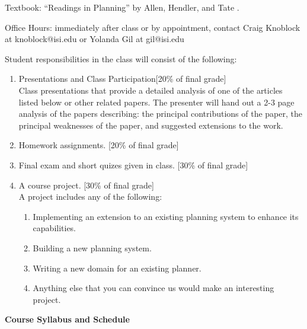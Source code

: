 {\flushleft Textbook: ``Readings in Planning'' by Allen, Hendler, and
Tate \cite{allen90}.}

{\flushleft Office Hours: immediately after class or by appointment,
contact Craig Knoblock at knoblock@isi.edu or Yolanda Gil at gil@isi.edu}

{\flushleft Student responsibilities in the class will consist of the following:}

\begin{enumerate}
\item Presentations and Class Participation[20\% of final grade]\\
Class presentations that provide a detailed analysis of one of the
articles listed below or other related papers.  The presenter will
hand out a 2-3 page analysis of the papers describing: the principal
contributions of the paper, the principal weaknesses of the paper, and
suggested extensions to the work.

\item Homework assignments. [20\% of final grade]

\item Final exam and short quizes given in class. [30\% of final grade]

\item A course project. [30\% of final grade]\\
A project includes any of the following:
\begin{enumerate}
\item Implementing an extension to an existing planning system to
      enhance its capabilities.
\item Building a new planning system.
\item Writing a new domain for an existing planner.
\item Anything else that you can convince us would make an interesting
      project.
\end{enumerate}
\end{enumerate}

\newpage
{\large\bf Course Syllabus and Schedule}

